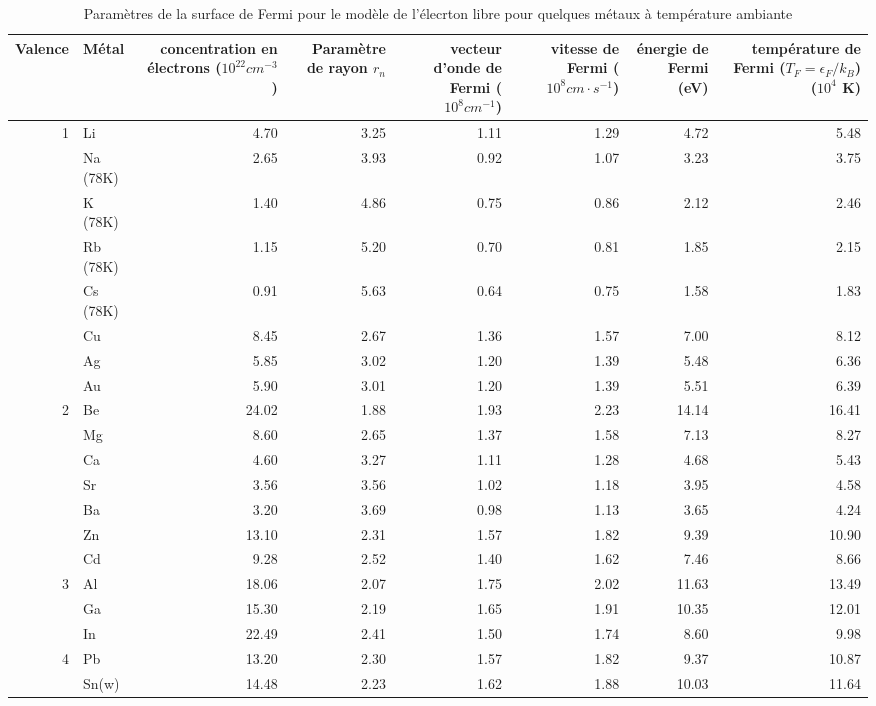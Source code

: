 \begin{table*}[ht]
\footnotesize
\begin{center}
\begin{tabularx}{\textwidth}{rlRRRRRR}
\toprule
Valence & Métal & concentration en électrons ($10^{22} cm^{-3}$) & Paramètre de rayon $r_n$ & vecteur d'onde de Fermi ($10^8 cm^{-1}$) & vitesse de Fermi ($10^8 cm\cdot s^{-1}$) & énergie de Fermi (eV) & température de Fermi ($T_F =\epsilon_F / k_B$) ($10^4$ K)\\
 & Li & 4.70 & 3.25 & 1.11 & 1.29 & 4.72 & 5.48 \\
  & Na (78K) & 2.65 & 3.93 & 0.92 & 1.07 & 3.23 & 3.75\\
  & K (78K) & 1.40 & 4.86 & 0.75 & 0.86 & 2.12 & 2.46\\
  & Rb (78K) & 1.15 & 5.20 & 0.70 & 0.81 & 1.85 & 2.15\\
  & Cs (78K) & 0.91 & 5.63 & 0.64 & 0.75 & 1.58 & 1.83\\
  & Cu & 8.45 & 2.67 & 1.36 & 1.57 & 7.00 & 8.12\\
  & Ag & 5.85 & 3.02 & 1.20 & 1.39 & 5.48 & 6.36\\
  & Au & 5.90 & 3.01 & 1.20 & 1.39 & 5.51 & 6.39\\
2 & Be & 24.02 & 1.88 & 1.93 & 2.23 & 14.14 & 16.41\\
  & Mg & 8.60 & 2.65 & 1.37 & 1.58 & 7.13 & 8.27\\
  & Ca & 4.60 & 3.27 & 1.11 & 1.28 & 4.68 & 5.43\\
  & Sr & 3.56 & 3.56 & 1.02 & 1.18 & 3.95 & 4.58\\
  & Ba & 3.20 & 3.69 & 0.98 & 1.13 & 3.65 & 4.24\\
  & Zn & 13.10 & 2.31 & 1.57 & 1.82 & 9.39 & 10.90\\
  & Cd & 9.28 & 2.52 & 1.40 & 1.62 & 7.46 & 8.66\\
3 & Al & 18.06 & 2.07 & 1.75 & 2.02 & 11.63 & 13.49\\
  & Ga & 15.30 & 2.19 & 1.65 & 1.91 & 10.35 & 12.01\\
  & In & 22.49 & 2.41 & 1.50 & 1.74 & 8.60 & 9.98\\
4 & Pb & 13.20 & 2.30 & 1.57 & 1.82 & 9.37 & 10.87\\
  & Sn(w) & 14.48 & 2.23 & 1.62 & 1.88 & 10.03 & 11.64\\
\bottomrule
\end{tabularx}
\end{center}
\caption{Paramètres de la surface de Fermi pour le modèle de l'élecrton libre
pour quelques métaux à température ambiante}
\label{}
\end{table*}

